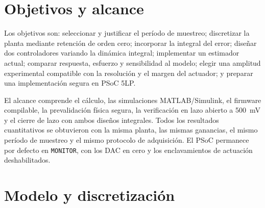 \documentclass[conference]{IEEEtran}
\begin{document}
\section{Objetivos y alcance}
Los objetivos son: seleccionar y justificar el período de muestreo; discretizar la planta mediante retención de orden cero; incorporar la integral del error; diseñar dos controladores variando la dinámica integral; implementar un estimador actual; comparar respuesta, esfuerzo y sensibilidad al modelo; elegir una amplitud experimental compatible con la resolución y el margen del actuador; y preparar una implementación segura en PSoC 5LP.

El alcance comprende el cálculo, las simulaciones MATLAB/Simulink, el firmware compilable, la prevalidación física segura, la verificación en lazo abierto a \SI{500}{mV} y el cierre de lazo con ambos diseños integrales. Todos los resultados cuantitativos se obtuvieron con la misma planta, las mismas ganancias, el mismo período de muestreo y el mismo protocolo de adquisición. El PSoC permanece por defecto en \texttt{MONITOR}, con los DAC en cero y los enclavamientos de actuación deshabilitados.

\section{Modelo y discretización}
\end{document}
